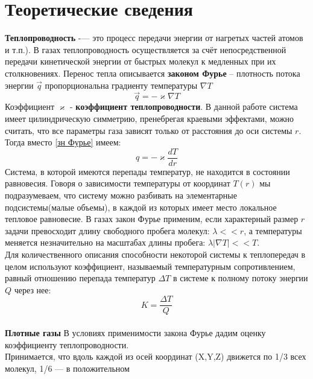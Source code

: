 \documentclass[12pt]{article}
\begin{document}
    \section{Теоретические сведения}
        \textbf{Теплопроводность} -— это процесс передачи энергии от нагретых частей атомов и т.п.). В газах теплопроводность осуществляется за
        счёт непосредственной передачи кинетической энергии от быстрых молекул к медленных при их столкновениях. Перенос тепла
        описывается \textbf{законом Фурье} \cite{sivykhin} -- плотность потока энергии $\vec{q}$ пропорциональна градиенту температуры $\nabla T$
        \begin{equation}\label{зн Фурье}
            \vec{q} = - \varkappa \nabla T
        \end{equation}
        Коэффициент $\varkappa$ - \textbf{коэффициент теплопроводности}. В данной работе система имеет цилиндрическую симметрию, пренебрегая краевыми эффектами,
        можно считать, что все параметры газа зависят только от расстояния до оси системы $r$. Тогда вместо \ref{зн Фурье} имеем:
        \begin{equation}\label{tepl}
            q = - \varkappa \frac{dT}{dr}
        \end{equation}
        Система, в которой имеются перепады температур, не находится в состоянии равновесия. Говоря о зависимости температуры от координат $T(r)$ мы подразумеваем, что систему
        можно разбивать на элементарные подсистемы(малые объемы), в каждой из которых имеет место локальное тепловое равновесие. В газах
        закон Фурье применим, если характерный размер $r$ задачи превосходит длину свободного пробега молекул: $\lambda << r$, а температуры меняется незначительно на масштабах
        длины пробега: $\lambda|\nabla T| << T$.\\
        Для количественного описания способности некоторой системы к теплопередач в целом используют коэффициент, называемый температурным сопротивлением,
        равный отношению перепада температур $\Delta T$ в системе к полному потоку энергии $Q$ через нее:
        \begin{equation}\label{q = }
            K = \frac{\Delta T}{Q}
        \end{equation}\\
        \textbf{Плотные газы} В условиях применимости закона Фурье дадим оценку коэффициенту теплопроводности.\\
        Принимается, что вдоль каждой из осей координат (X,Y,Z) движется по 1/3 всех молекул, 1/6 — в положительном
\end{document}
